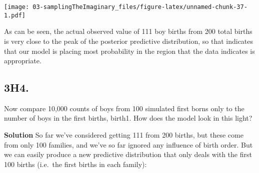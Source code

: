 \documentclass[
]{book}
\begin{document}
\texttt{[image: 03-samplingTheImaginary\_files/figure-latex/unnamed-chunk-37-1.pdf]}

As can be seen, the actual observed value of 111 boy births from 200 total births is very close to the peak of the posterior predictive distribution, so that indicates that our model is placing most probability in the region that the data indicates is appropriate.

\hypertarget{h4.}{%
\subsection{3H4.}\label{h4.}}

Now compare 10,000 counts of boys from 100 simulated first borns only to the number of boys in the first births, birth1. How does the model look in this light?

\textbf{Solution}
So far we've considered getting 111 from 200 births, but these come from only 100 families, and we've so far ignored any influence of birth order. But we can easily produce a new predictive distribution that only deals with the first 100 births (i.e.~the first births in each family):
\end{document}

